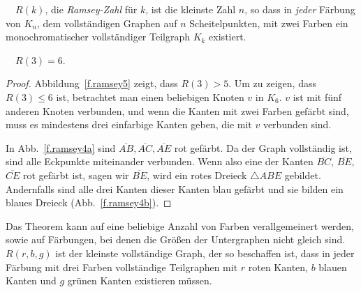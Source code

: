 \begin{definition}
$\quad R(k)$, die \emph{Ramsey-Zahl} für $k$, ist die kleinste Zahl $n$, so dass in \emph{jeder} Färbung von $K_{n}$, dem vollständigen Graphen auf $n$ Scheitelpunkten, mit zwei Farben ein monochromatischer vollständiger Teilgraph $K_k$ existiert.
\end{definition}
\begin{theorem}[Ramsey]
$\quad R(3)=6$.\label{thm.ramsey}
\end{theorem}

\begin{proof}
Abbildung~\ref{f.ramsey5} zeigt, dass $R(3)>5$. Um zu zeigen, dass $R(3)\leq 6$ ist, betrachtet man einen beliebigen Knoten $v$ in $K_6$. $v$ ist mit fünf anderen Knoten verbunden, und wenn die Kanten mit zwei Farben gefärbt sind, muss es mindestens drei einfarbige Kanten geben, die mit $v$ verbunden sind. 

In Abb.~\ref{f.ramsey4a} sind $\overline{AB}, \overline{AC}, \overline{AE}$ rot gefärbt. Da der Graph vollständig ist, sind alle Eckpunkte miteinander verbunden. Wenn also eine der Kanten $\overline{BC}$, $\overline{BE}$, $\overline{CE}$ rot gefärbt ist, sagen wir $\overline{BE}$, wird ein rotes Dreieck $\triangle ABE$ gebildet. Andernfalls sind alle drei Kanten dieser Kanten blau gefärbt und sie bilden ein blaues Dreieck (Abb.~\ref{f.ramsey4b}).
\end{proof}

Das Theorem kann auf eine beliebige Anzahl von Farben verallgemeinert werden, sowie auf Färbungen, bei denen die Größen der Untergraphen nicht gleich sind. $R(r,b,g)$ ist der kleinste vollständige Graph, der so beschaffen ist, dass in jeder Färbung mit drei Farben vollständige Teilgraphen mit $r$ roten Kanten, $b$ blauen Kanten und $g$ grünen Kanten existieren müssen.

